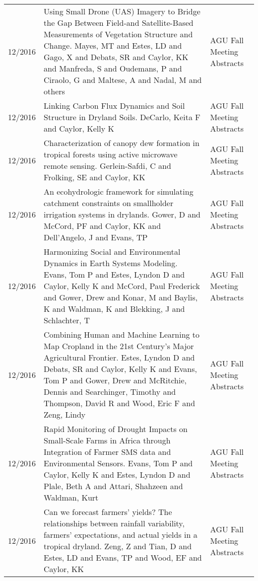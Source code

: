 
\begin{supertabular}{lp{10.0cm}p{4.5cm}}
12/2016 & Using Small Drone (UAS) Imagery to Bridge the Gap Between Field-and Satellite-Based Measurements of Vegetation Structure and Change. Mayes, MT and Estes, LD and Gago, X and Debats, SR and Caylor, KK and Manfreda, S and Oudemans, P and Ciraolo, G and Maltese, A and Nadal, M and others & AGU Fall Meeting Abstracts \\
12/2016 & Linking Carbon Flux Dynamics and Soil Structure in Dryland Soils. DeCarlo, Keita F and Caylor, Kelly K & AGU Fall Meeting Abstracts \\
12/2016 & Characterization of canopy dew formation in tropical forests using active microwave remote sensing. Gerlein-Safdi, C and Frolking, SE and Caylor, KK & AGU Fall Meeting Abstracts \\
12/2016 & An ecohydrologic framework for simulating catchment constraints on smallholder irrigation systems in drylands. Gower, D and McCord, PF and Caylor, KK and Dell'Angelo, J and Evans, TP & AGU Fall Meeting Abstracts \\
12/2016 & Harmonizing Social and Environmental Dynamics in Earth Systems Modeling. Evans, Tom P and Estes, Lyndon D and Caylor, Kelly K and McCord, Paul Frederick and Gower, Drew and Konar, M and Baylis, K and Waldman, K and Blekking, J and Schlachter, T & AGU Fall Meeting Abstracts \\
12/2016 & Combining Human and Machine Learning to Map Cropland in the 21st Century's Major Agricultural Frontier. Estes, Lyndon D and Debats, SR and Caylor, Kelly K and Evans, Tom P and Gower, Drew and McRitchie, Dennis and Searchinger, Timothy and Thompson, David R and Wood, Eric F and Zeng, Lindy & AGU Fall Meeting Abstracts \\
12/2016 & Rapid Monitoring of Drought Impacts on Small-Scale Farms in Africa through Integration of Farmer SMS data and Environmental Sensors. Evans, Tom P and Caylor, Kelly K and Estes, Lyndon D and Plale, Beth A and Attari, Shahzeen and Waldman, Kurt & AGU Fall Meeting Abstracts \\
12/2016 & Can we forecast farmers' yields? The relationships between rainfall variability, farmers' expectations, and actual yields in a tropical dryland. Zeng, Z and Tian, D and Estes, LD and Evans, TP and Wood, EF and Caylor, KK & AGU Fall Meeting Abstracts \\

\end{supertabular}
